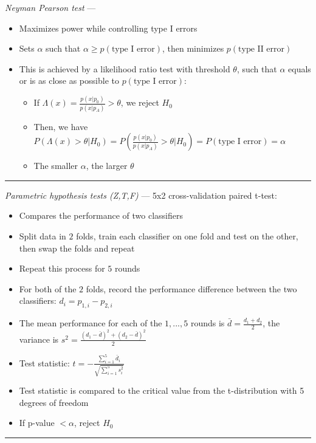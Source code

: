 \emph{Neyman Pearson test} ---
\begin{itemize}
    \item Maximizes power while controlling type I errors
    \item Sets $\alpha$ such that $\alpha \geq p(\textrm{type I error})$, then minimizes $p(\textrm{type II error})$
    \item This is achieved by a likelihood ratio test with threshold $\theta$, such that $\alpha$ equals or is as close as possible to $ p(\textrm{type I error})$: 
    \begin{itemize}
        \item If $\Lambda(x) = \frac{p(x|p_0)}{p(x|p_A)} > \theta$, we reject $H_0$
        \item Then, we have $P(\Lambda(x) > \theta | H_0) = P(\frac{p(x|p_0)}{p(x|p_A)} > \theta | H_0 ) = P(\textrm{type I error}) = \alpha$
        \item The smaller $\alpha$, the larger $\theta$
    \end{itemize}
\end{itemize}

{\color{lightgray}\hrule height 0.001mm}

\emph{Parametric hypothesis tests (Z,T,F)} --- 
5x2 cross-validation paired t-test:
\begin{itemize}
    \item Compares the performance of two classifiers
    \item Split data in $2$ folds, train each classifier on one fold and test on the other, then swap the folds and repeat
    \item Repeat this process for $5$ rounds
    \item For both of the $2$ folds, record the performance difference between the two classifiers: $d_i = p_{1,i} - p_{2,i}$
    \item The mean performance for each of the $1,...,5$ rounds is $\bar{d} = \frac{d_1+d_2}{2}$, the variance is $s^2 = \frac{(d_1-\bar{d})^2 + (d_2-\bar{d})^2}{2}$
    \item Test statistic: $t = -\frac{\sum_{i=1}^5 \bar{d}_i}{\sqrt{\sum_{i=1}^5 s_i^2}}$
    \item Test statistic is compared to the critical value from the t-distribution with 5 degrees of freedom
    \item If p-value $< \alpha$, reject $H_0$
\end{itemize}

{\color{lightgray}\hrule height 0.001mm}

